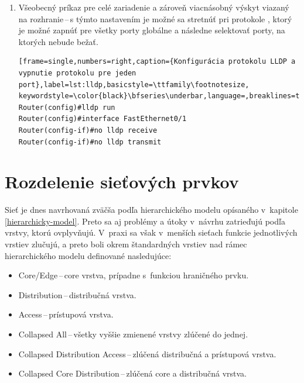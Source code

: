 \begin{enumerate}
\begin{minipage}{\linewidth}		
\begin{lstlisting}[frame=single,numbers=right,caption={Konfigurácia autentizácie OSPF na porte alebo v~procese},label=lst:ospf-auth,basicstyle=\ttfamily\footnotesize, keywordstyle=\color{black}\bfseries\underbar,language=,breaklines=true]
Router(config)#interface FastEthernet0/1
Router(config-if)#ip ospf message-digest-key 1 md5 heslo
Router(config-if)#ip ospf authentication message-digest
Router(config)#router ospf 1
Router(config-router)#area 0 authentication message-digest
Router(config-router)#area 0 authentication key-chain 1
\end{lstlisting}
\end{minipage}
	
	
	\item \vspace{2em} Všeobecný príkaz pre celé zariadenie a zároveň viacnásobný výskyt viazaný na rozhranie\,--\,s týmto nastavením je možné sa stretnúť pri protokole , ktorý je možné zapnúť pre všetky porty globálne a následne selektovať porty, na ktorých nebude bežať.
	
\begin{minipage}{\linewidth}		
\begin{lstlisting}[frame=single,numbers=right,caption={Konfigurácia protokolu LLDP a vypnutie protokolu pre jeden port},label=lst:lldp,basicstyle=\ttfamily\footnotesize, keywordstyle=\color{black}\bfseries\underbar,language=,breaklines=true]
Router(config)#lldp run
Router(config)#interface FastEthernet0/1
Router(config-if)#no lldp receive
Router(config-if)#no lldp transmit\end{lstlisting}
\end{minipage}
	
\end{enumerate}

\section{Rozdelenie sieťových prvkov}
\label{hierarchydesign}
Sieť je dnes navrhovaná zväčša podľa hierarchického modelu opísaného v~kapitole \ref{hierarchicky-model}. Preto sa aj problémy a útoky v~návrhu zatrieďujú podľa vrstvy, ktorú ovplyvňujú. V~praxi sa však v~menších sieťach funkcie jednotlivých vrstiev zlučujú, a preto boli okrem štandardných vrstiev nad rámec hierarchického modelu definované nasledujúce:

\begin{itemize}
	\item Core/Edge\,--\,core vrstva, prípadne s~funkciou hraničného prvku.
	\item Distribution\,--\,distribučná vrstva.
	\item Access\,--\,prístupová vrstva.
	\item Collapsed All\,--\,všetky vyššie zmienené vrstvy zlúčené do jednej.
	\item Collapsed Distribution Access\,--\,zlúčená distribučná a prístupová vrstva.
	\item Collapsed Core Distribution\,--\,zlúčená core a distribučná vrstva.
\end{itemize}

